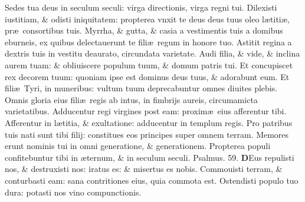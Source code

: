 \documentclass[a5paper,10pt]{book}
\def\ae{æ}
\begin{document}
\begin{multicols*}{2}
\newline \color{red} S\color{black}edes tua deus in seculum seculi: virga directionis, virga regni tui.
\newline \color{red} D\color{black}ilexisti iustitiam, \& odisti iniquitatem: propterea vnxit te deus deus tuus oleo l\ae titi\ae , pr\ae \ consortibus tuis.
\newline \color{red} M\color{black}yrrha, \& gutta, \& casia a vestimentis tuis a domibus eburneis, ex quibus delectauerunt te fili\ae \ regum in honore tuo.
\newline \color{red} A\color{black}stitit regina a dextris tuis in vestitu deaurato, circundata varietate.
\newline \color{red} A\color{black}udi filia, \& vide, \& inclina aurem tuam: \& obliuiscere populum tuum, \& domum patris tui.
\newline \color{red} E\color{black}t concupiscet rex decorem tuum: quoniam ipse est dominus deus tuus, \& adorabunt eum.
\newline \color{red} E\color{black}t fili\ae \ Tyri, in muneribus: vultum tuum deprecabuntur omnes diuites plebis.
\newline \color{red} O\color{black}mnis gloria eius fili\ae \ regis ab intus, in fimbrijs aureis, circumamicta varietatibus.
\newline \color{red} A\color{black}dducentur regi virgines post eam: proxim\ae \ eius afferentur tibi.
\newline \color{red} A\color{black}fferentur in l\ae titia, \& exultatione: adducentur in templum regis.
\newline \color{red} P\color{black}ro patribus tuis nati sunt tibi filij: constitues eos principes super omnem terram.
\newline \color{red} M\color{black}emores erunt nominis tui in omni generatione, \& generationem.
\newline \color{red} P\color{black}ropterea populi confitebuntur tibi in \ae ternum, \& in seculum seculi.
\newline \color{red} Psalmus. 59. \color{black}
\vspace{-.5em}
\lettrine[lines=2]{\bfseries \color{red} D}{}Eus repulisti nos, \& destruxisti nos: iratus es: \& misertus es nobis.
\newline \color{red} C\color{black}ommouisti terram, \& conturbasti eam: sana contritiones eius, quia commota est.
\newline \color{red} O\color{black}stendisti populo tuo dura: potasti nos vino compunctionis.

\end{multicols*}
\end{document}

